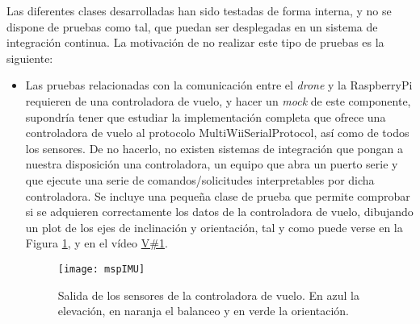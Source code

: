 Las diferentes clases desarrolladas han sido testadas de forma interna, y no se dispone de pruebas como tal, que puedan ser desplegadas en un sistema de integración continua. 
La motivación de no realizar este tipo de pruebas es la siguiente: 
\begin{itemize}
\item Las pruebas relacionadas con la comunicación entre el \emph{drone} y la RaspberryPi requieren de una controladora de vuelo, y hacer un \emph{mock} de este componente, supondría tener que estudiar la implementación completa que ofrece una controladora de vuelo al protocolo MultiWiiSerialProtocol, así como de todos los sensores. De no hacerlo, no existen sistemas de integración que pongan a nuestra disposición una controladora, un equipo que abra un puerto serie y que ejecute una serie de comandos/solicitudes interpretables por dicha controladora. Se incluye una pequeña clase de prueba que permite comprobar si se adquieren correctamente los datos de la controladora de vuelo, dibujando un plot de los ejes de inclinación y orientación, tal y como puede verse en la Figura \ref{fig:mspIMU}, y en el vídeo \href{https://universidaddeburgos-my.sharepoint.com/:v:/g/personal/mbm0089_alu_ubu_es/EezmUjB1BSdKp-_VQrUkIXwBPSrvQdSnmhSTd-QA3jJaIQ?e=RYEaIl}{V\#1}.
\begin{figure}[H]
	\centering
	\texttt{[image: mspIMU]}
	\caption[Recepción de la IMU mediante MSPio]{Salida de los sensores de la controladora de vuelo. En azul la elevación, en naranja el balanceo y en verde la orientación.}\label{fig:mspIMU}
\end{figure}



\end{itemize}
